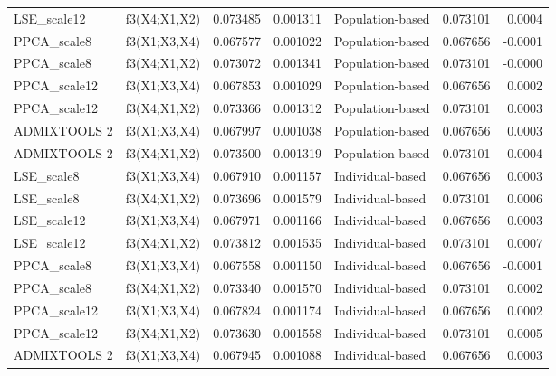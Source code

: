\begin{tabular}{llrrlrr}
 LSE\_scale12 &    f3(X4;X1,X2) & 0.073485 &        0.001311 &                     Population-based &    0.073101 &  0.0004 \\
 PPCA\_scale8 &    f3(X1;X3,X4) & 0.067577 &        0.001022 &                     Population-based &    0.067656 & -0.0001 \\
 PPCA\_scale8 &    f3(X4;X1,X2) & 0.073072 &        0.001341 &                     Population-based &    0.073101 & -0.0000 \\
PPCA\_scale12 &    f3(X1;X3,X4) & 0.067853 &        0.001029 &                     Population-based &    0.067656 &  0.0002 \\
PPCA\_scale12 &    f3(X4;X1,X2) & 0.073366 &        0.001312 &                     Population-based &    0.073101 &  0.0003 \\
ADMIXTOOLS 2 &    f3(X1;X3,X4) & 0.067997 &        0.001038 &                     Population-based &    0.067656 &  0.0003 \\
ADMIXTOOLS 2 &    f3(X4;X1,X2) & 0.073500 &        0.001319 &                     Population-based &    0.073101 &  0.0004 \\
  LSE\_scale8 &    f3(X1;X3,X4) & 0.067910 &        0.001157 &                     Individual-based &    0.067656 &  0.0003 \\
  LSE\_scale8 &    f3(X4;X1,X2) & 0.073696 &        0.001579 &                     Individual-based &    0.073101 &  0.0006 \\
 LSE\_scale12 &    f3(X1;X3,X4) & 0.067971 &        0.001166 &                     Individual-based &    0.067656 &  0.0003 \\
 LSE\_scale12 &    f3(X4;X1,X2) & 0.073812 &        0.001535 &                     Individual-based &    0.073101 &  0.0007 \\
 PPCA\_scale8 &    f3(X1;X3,X4) & 0.067558 &        0.001150 &                     Individual-based &    0.067656 & -0.0001 \\
 PPCA\_scale8 &    f3(X4;X1,X2) & 0.073340 &        0.001570 &                     Individual-based &    0.073101 &  0.0002 \\
PPCA\_scale12 &    f3(X1;X3,X4) & 0.067824 &        0.001174 &                     Individual-based &    0.067656 &  0.0002 \\
PPCA\_scale12 &    f3(X4;X1,X2) & 0.073630 &        0.001558 &                     Individual-based &    0.073101 &  0.0005 \\
ADMIXTOOLS 2 &    f3(X1;X3,X4) & 0.067945 &        0.001088 &                     Individual-based &    0.067656 &  0.0003 \\

\end{tabular}
